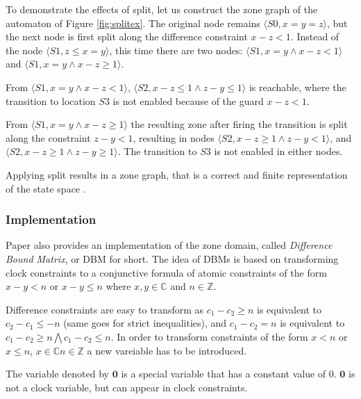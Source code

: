 To demonstrate the effects of split, let us construct the zone graph of the automaton of Figure \ref{fig:splitex}. The original node remains  $\langle S0,x=y=z \rangle$, but the next node is first split along the difference constraint $x-z<1$. Instead of the node $\langle S1,z \leq x=y \rangle$, this time there are two nodes: $\langle S1, x=y \wedge x-z<1 \rangle$ and $\langle S1, x=y \wedge x-z \geq 1 \rangle$.

From  $\langle S1, x=y \wedge x-z<1 \rangle$,  $\langle S2,x-z \leq 1 \wedge z-y \leq 1\rangle$ is reachable, where the transition to location $S3$ is not enabled because of the guard $x-z < 1$.

From $\langle S1, x=y \wedge x-z \geq 1 \rangle$ the resulting zone after firing the transition is split along the constraint $z-y<1$, resulting in nodes $\langle S2, x-z \geq 1 \wedge z-y < 1\rangle$, and $\langle S2, x-z \geq 1 \wedge z-y \geq 1\rangle$. The transition to $S3$ is not enabled in either nodes. 

Applying split results in a zone graph, that is a correct and finite representation of the state space \cite{bengtsson2004timed}.

\subsubsection{Implementation}

Paper \cite{bengtsson2004timed} also provides an implementation of the zone domain, called \emph{Difference Bound Matrix}, or DBM for short. The idea of DBMs is based on transforming clock constraints to a conjunctive formula of atomic constraints of the form $x - y < n$ or $x -y \leq n$ where $x,y \in \mathbb{C}$ and $n \in \mathds{Z}$.

Difference constraints are easy to transform as $c_1 - c_2 \geq n$ is equivalent to $c_2 - c_1 \leq -n$ (same goes for strict inequalities), and $c_1 - c_2 = n$ is equivalent to $c_1 - c_2 \geq n \bigwedge c_1 - c_2 \leq n$. In order to transform constraints of the form $x<n$ or$x \leq n$, $x \in \mathbb{C} n \in \mathds{Z}$ a new vareiable has to be introduced.

\begin{dfn}
	The variable denoted by $\textbf{0}$ is a special variable that has a constant value of 0. $\textbf{0}$ is not a clock variable, but can appear in clock constraints.
\end{dfn}

